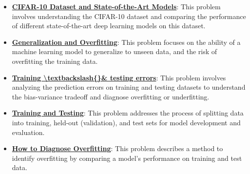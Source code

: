 \documentclass{article}%
\begin{document}
\begin{itemize}[leftmargin=*]
\item \href{https://purdue.brightspace.com/d2l/common/assets/pdfjs-d2l-dist/1.0.14-legacy/web/viewer.html?file=\%2Fcontent\%2Fenforced\%2F1095467-wl.202510.CS.24300.001\%2F09L1-cnn.pdf\%3Fou\%3D1095467\&lang=en-us\&container=d2l-fileviewer-rendered-pdf\&fullscreen=d2l-fileviewer-rendered-pdf-dialog\&height=667#page=23}{\textbf{CIFAR{-}10 Dataset and State{-}of{-}the{-}Art Models}}: This problem involves understanding the CIFAR-10 dataset and comparing the performance of different state-of-the-art deep learning models on this dataset.%
\end{itemize}%
\begin{itemize}[leftmargin=*]%
\item \href{https://purdue.brightspace.com/d2l/common/assets/pdfjs-d2l-dist/1.0.14-legacy/web/viewer.html?file=\%2Fcontent\%2Fenforced\%2F1095467-wl.202510.CS.24300.001\%2F10L1-CrossValidation.pdf\%3Fou\%3D1095467\&lang=en-us\&container=d2l-fileviewer-rendered-pdf\&fullscreen=d2l-fileviewer-rendered-pdf-dialog\&height=667#page=2}{\textbf{Generalization and Overfitting}}: This problem focuses on the ability of a machine learning model to generalize to unseen data, and the risk of overfitting the training data.%
\item \href{https://purdue.brightspace.com/d2l/common/assets/pdfjs-d2l-dist/1.0.14-legacy/web/viewer.html?file=\%2Fcontent\%2Fenforced\%2F1095467-wl.202510.CS.24300.001\%2F10L1-CrossValidation.pdf\%3Fou\%3D1095467\&lang=en-us\&container=d2l-fileviewer-rendered-pdf\&fullscreen=d2l-fileviewer-rendered-pdf-dialog\&height=667#page=4}{\textbf{Training \textbackslash{}textbackslash\{\}\& testing errors}}: This problem involves analyzing the prediction errors on training and testing datasets to understand the bias-variance tradeoff and diagnose overfitting or underfitting.%
\item \href{https://purdue.brightspace.com/d2l/common/assets/pdfjs-d2l-dist/1.0.14-legacy/web/viewer.html?file=\%2Fcontent\%2Fenforced\%2F1095467-wl.202510.CS.24300.001\%2F10L1-CrossValidation.pdf\%3Fou\%3D1095467\&lang=en-us\&container=d2l-fileviewer-rendered-pdf\&fullscreen=d2l-fileviewer-rendered-pdf-dialog\&height=667#page=5}{\textbf{Training and Testing}}: This problem addresses the process of splitting data into training, held-out (validation), and test sets for model development and evaluation.%
\item \href{https://purdue.brightspace.com/d2l/common/assets/pdfjs-d2l-dist/1.0.14-legacy/web/viewer.html?file=\%2Fcontent\%2Fenforced\%2F1095467-wl.202510.CS.24300.001\%2F10L1-CrossValidation.pdf\%3Fou\%3D1095467\&lang=en-us\&container=d2l-fileviewer-rendered-pdf\&fullscreen=d2l-fileviewer-rendered-pdf-dialog\&height=667#page=12}{\textbf{How to Diagnose Overfitting}}: This problem describes a method to identify overfitting by comparing a model's performance on training and test data.%

\end{itemize}
\end{document}
